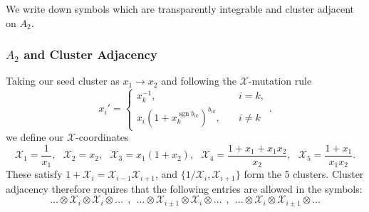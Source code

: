 \documentclass[12pt]{article}
\DeclareMathOperator{\sgn}{sgn}
\def\x{\mathcal{X}}
\begin{document}
\thispagestyle{fancyplain}
 
\fancyhf{}
 
\cfoot{\fancyplain{}{\thepage}}


\noindent We write down symbols which are transparently integrable and cluster adjacent on $A_2$. 

\subsubsection*{$A_2$ and Cluster Adjacency}
Taking our seed cluster as $x_1\to x_2$ and following the $\x$-mutation rule
\begin{equation}
	x_{i}' =
	\begin{cases}
		x_{k}^{-1}, &\quad i=k,\\
		x_{i} (1+x_{k}^{\sgn b_{i k}})^{b_{i k}}, &\quad i \neq k
  	\end{cases}.
\end{equation}
we define our $\x$-coordinates
\begin{equation}\label{def:xcoords}
	\x_1 = \frac{1}{x_1}, ~~~\x_2 = x_2,~~~ \x_3 = x_1 (1 + x_2),~~~ \x_4=\frac{1+x_1+x_1 x_2}{x_2},~~~ \x_5 = \frac{1+x_1}{x_1 x_2}.
\end{equation}
These satisfy $1+\x_i = \x_{i-1}\x_{i+1}$, and $\{1/\x_i, \x_{i+1}\}$ form the 5 clusters. Cluster adjacency therefore requires that the following entries are allowed in the symbols:
\begin{equation}
	\ldots\otimes\x_i\otimes\x_i\otimes\ldots~~,~~
	\ldots\otimes\x_{i\pm1}\otimes\x_i\otimes\ldots~~,~~
	\ldots\otimes\x_i\otimes\x_{i\pm1}\otimes\ldots
\end{equation}
\end{document}
